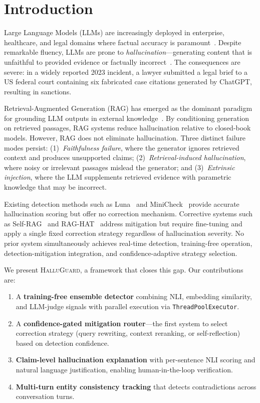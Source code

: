 \documentclass[conference]{IEEEtran}
\begin{document}
\section{Introduction}

Large Language Models (LLMs) are increasingly deployed in enterprise, healthcare, and legal domains where factual accuracy is paramount~\cite{ji2023survey}. Despite remarkable fluency, LLMs are prone to \textit{hallucination}---generating content that is unfaithful to provided evidence or factually incorrect~\cite{ji2023survey}. The consequences are severe: in a widely reported 2023 incident, a lawyer submitted a legal brief to a US federal court containing six fabricated case citations generated by ChatGPT, resulting in sanctions.

Retrieval-Augmented Generation (RAG) has emerged as the dominant paradigm for grounding LLM outputs in external knowledge~\cite{lewis2020rag}. By conditioning generation on retrieved passages, RAG systems reduce hallucination relative to closed-book models. However, RAG does not eliminate hallucination. Three distinct failure modes persist:
(1)~\textit{Faithfulness failure}, where the generator ignores retrieved context and produces unsupported claims;
(2)~\textit{Retrieval-induced hallucination}, where noisy or irrelevant passages mislead the generator; and
(3)~\textit{Extrinsic injection}, where the LLM supplements retrieved evidence with parametric knowledge that may be incorrect.

Existing detection methods such as Luna~\cite{ravi2024luna} and MiniCheck~\cite{tang2024minicheck} provide accurate hallucination scoring but offer no correction mechanism. Corrective systems such as Self-RAG~\cite{asai2024selfrag} and RAG-HAT~\cite{wu2024raghat} address mitigation but require fine-tuning and apply a single fixed correction strategy regardless of hallucination severity. No prior system simultaneously achieves real-time detection, training-free operation, detection-mitigation integration, and confidence-adaptive strategy selection.

We present \textsc{HalluGuard}, a framework that closes this gap. Our contributions are:
\begin{enumerate}
    \item A \textbf{training-free ensemble detector} combining NLI, embedding similarity, and LLM-judge signals with parallel execution via \texttt{ThreadPoolExecutor}.
    \item A \textbf{confidence-gated mitigation router}---the first system to select correction strategy (query rewriting, context reranking, or self-reflection) based on detection confidence.
    \item \textbf{Claim-level hallucination explanation} with per-sentence NLI scoring and natural language justification, enabling human-in-the-loop verification.
    \item \textbf{Multi-turn entity consistency tracking} that detects contradictions across conversation turns.
\end{enumerate}
\end{document}
